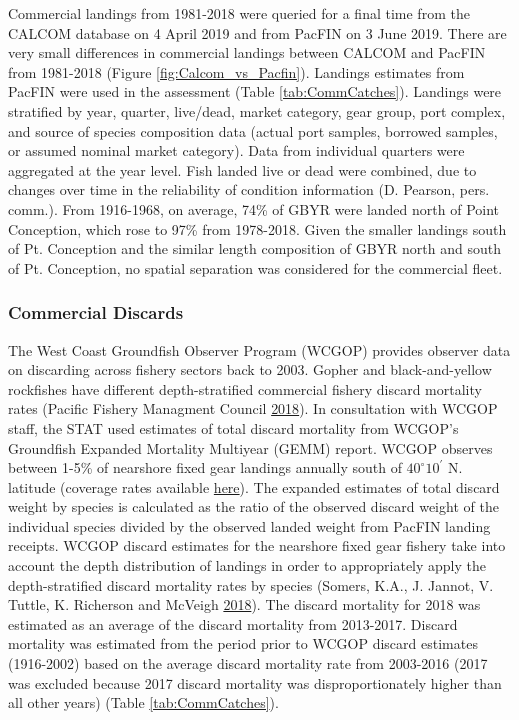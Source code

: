 \documentclass[12pt,]{article}
\begin{document}
Commercial landings from 1981-2018 were queried for a final time from
the CALCOM database on 4 April 2019 and from PacFIN on 3 June 2019.
There are very small differences in commercial landings between CALCOM
and PacFIN from 1981-2018 (Figure \ref{fig:Calcom_vs_Pacfin}). Landings
estimates from PacFIN were used in the assessment (Table
\ref{tab:CommCatches}). Landings were stratified by year, quarter,
live/dead, market category, gear group, port complex, and source of
species composition data (actual port samples, borrowed samples, or
assumed nominal market category). Data from individual quarters were
aggregated at the year level. Fish landed live or dead were combined,
due to changes over time in the reliability of condition information (D.
Pearson, pers. comm.). From 1916-1968, on average, 74\% of GBYR were
landed north of Point Conception, which rose to 97\% from 1978-2018.
Given the smaller landings south of Pt. Conception and the similar
length composition of GBYR north and south of Pt. Conception, no spatial
separation was considered for the commercial fleet.

\subsubsection{Commercial Discards}\label{commercial-discards}

The West Coast Groundfish Observer Program (WCGOP) provides observer
data on discarding across fishery sectors back to 2003. Gopher and
black-and-yellow rockfishes have different depth-stratified commercial
fishery discard mortality rates (Pacific Fishery Managment Council
\protect\hyperlink{ref-PSMFC2018}{2018}). In consultation with WCGOP
staff, the STAT used estimates of total discard mortality from WCGOP's
Groundfish Expanded Mortality Multiyear (GEMM) report. WCGOP observes
between 1-5\% of nearshore fixed gear landings annually south of
\(40^\circ 10^\prime\) N. latitude (coverage rates available
\href{https://www.nwfsc.noaa.gov/research/divisions/fram/observation/data_products/sector_products.cfm\#ob}{here}).
The expanded estimates of total discard weight by species is calculated
as the ratio of the observed discard weight of the individual species
divided by the observed landed weight from PacFIN landing receipts.
WCGOP discard estimates for the nearshore fixed gear fishery take into
account the depth distribution of landings in order to appropriately
apply the depth-stratified discard mortality rates by species (Somers,
K.A., J. Jannot, V. Tuttle, K. Richerson and McVeigh
\protect\hyperlink{ref-Somers2018}{2018}). The discard mortality for
2018 was estimated as an average of the discard mortality from
2013-2017. Discard mortality was estimated from the period prior to
WCGOP discard estimates (1916-2002) based on the average discard
mortality rate from 2003-2016 (2017 was excluded because 2017 discard
mortality was disproportionately higher than all other years) (Table
\ref{tab:CommCatches}).
\end{document}
